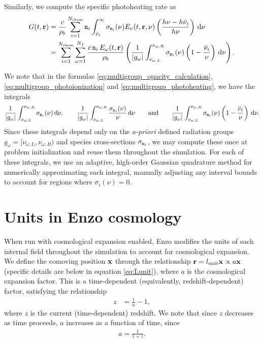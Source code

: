 \documentclass[10pt]{article}
\renewcommand{\(}{\left(}
\renewcommand{\)}{\right)}
\newcommand{\xvec}{{\bf x}}
\newcommand{\rvec}{{\bf r}}
\newcommand{\rhob}{\rho_b}
\newcommand{\Enu}{E_{\nu}}
\newcommand{\mn}{{\tt n}}
\newcommand{\Lunit}{l_{\text{unit}}}
\begin{document}
Similarly, we compute the specific photoheating rate as 
\begin{align}
\notag
   G(t,\rvec) &= 
   \frac{c}{\rhob} \sum_{i=1}^{N_\text{chem}} \mn_i
     \int_{\bar{\nu}_i}^{\infty} \sigma_{\mn_i}(\nu) \Enu(t,\rvec,\nu)
     \left(\frac{h\nu - h\bar{\nu}_i}{h\nu}\right)\,\mathrm d\nu \\
\label{eq:multigroup_photoheating}
     &= 
   \sum_{i=1}^{N_\text{chem}} \sum_{\omega=1}^{N_f} \frac{c\,\mn_i\, E_{\omega}(t,\rvec)}{\rhob} 
     \left(\frac{1}{|g_{\omega}|}\int_{\nu_{\omega,L}}^{\nu_{\omega,R}} \sigma_{\mn_i}(\nu) 
     \left(1 - \frac{\bar{\nu}_i}{\nu}\right)\,\mathrm d\nu\right).
\end{align}

We note that in the formulas
\eqref{eq:multigroup_opacity_calculation},
\eqref{eq:multigroup_photoionization} and
\eqref{eq:multigroup_photoheating}, we have the integrals
\begin{align}
  \label{eq:integrals} 
    \frac{1}{|g_{\omega}|}\int_{\nu_{\omega,L}}^{\nu_{\omega,R}}
    \sigma_{\mn_i}(\nu)\,\mathrm d\nu, \qquad
    \frac{1}{|g_{\omega}|}\int_{\nu_{\omega,L}}^{\nu_{\omega,R}} \frac{\sigma_{\mn_i}(\nu)}{\nu}\,\mathrm d\nu
    \qquad\text{and}\qquad
    \frac{1}{|g_{\omega}|}\int_{\nu_{\omega,L}}^{\nu_{\omega,R}} \sigma_{\mn_i}(\nu) \left(1 - \frac{\bar{\nu}_i}{\nu}\right)\,\mathrm d\nu.
\end{align}
Since these integrals depend only on the {\em a-priori} defined
radiation groups $g_{\omega}=[\nu_{\omega,L},\nu_{\omega,R})$ and
species cross-sections $\sigma_{\mn_i}$, we may compute these once at
problem initialization and reuse them throughout the simulation.  For
each of these integrals, we use an adaptive, high-order Gaussian
quadrature method for numerically approximating each integral,
manually adjusting any interval bounds to account for regions where
$\sigma_i(\nu)=0$.




\section{Units in Enzo cosmology}
\label{sec:units}

When run with cosmological expansion enabled, Enzo modifies the
units of each internal field throughout the simulation to account for
cosmological expansion.  We define the comoving position $\xvec$
through the relationship $\rvec = \Lunit\xvec \propto a \xvec$
(specific details are below in equation \eqref{eq:Lunit}), where $a$
is the cosmological expansion factor.  This is a time-dependent
(equivalently, redshift-dependent) factor, satisfying the relationship
\begin{align}
  \label{eq:CurrentRedshift}
  z &= \frac{1}{a} - 1,
\end{align}
where $z$ is the current (time-dependent) redshift.  We note that
since $z$ decreases as time proceeds, $a$ increases as a function of
time, since 
\begin{align}
  \label{eq:expansion_factor}
  a = \frac{1}{1+z}.
\end{align}
\end{document}
